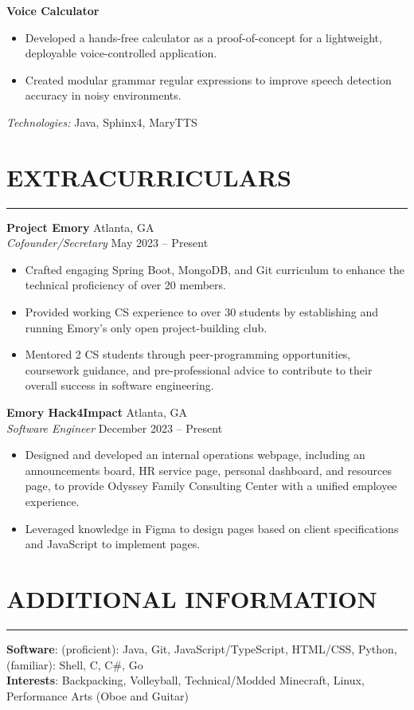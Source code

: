\documentclass[10.5pt]{article}
\begin{document}
\noindent
\textbf{Voice Calculator}
\begin{itemize}
    \item Developed a hands-free calculator as a proof-of-concept for a lightweight, deployable voice-controlled application. \item Created modular grammar regular expressions to improve speech detection accuracy in noisy environments.
\end{itemize}
\emph{Technologies:} {Java, Sphinx4, MaryTTS}

 \vspace{-\baselineskip}
\section*{\large\textbf{EXTRACURRICULARS}}
\vspace{-\baselineskip}
\noindent\rule{\textwidth}{0.4pt}


\noindent
\textbf{Project Emory} \hfill {Atlanta, GA} \\
\emph{Cofounder/Secretary} \hfill {May 2023} -- {Present}
\begin{itemize}
    \item Crafted engaging Spring Boot, MongoDB, and Git curriculum to enhance the technical proficiency of over 20 members. \item Provided working CS experience to over 30 students by establishing and running Emory's only open project-building club. \item Mentored 2 CS students through peer-programming opportunities, coursework guidance, and pre-professional advice to contribute to their overall success in software engineering.
\end{itemize}

\noindent
\textbf{Emory Hack4Impact} \hfill {Atlanta, GA} \\
\emph{Software Engineer} \hfill {December 2023} -- {Present}
\begin{itemize}
    \item Designed and developed an internal operations webpage, including an announcements board, HR service page, personal dashboard, and resources page, to provide Odyssey Family Consulting Center with a unified employee experience. \item Leveraged knowledge in Figma to design pages based on client specifications and JavaScript to implement pages.
\end{itemize}

 \vspace{-\baselineskip}
\section*{\large\textbf{ADDITIONAL INFORMATION}}
\vspace{-\baselineskip}
\noindent\rule{\textwidth}{0.4pt}

\noindent
\textbf{Software}: (proficient): Java, Git, JavaScript/TypeScript, HTML/CSS, Python, (familiar): Shell, C, C\#, Go\\ 
\noindent
\textbf{Interests}: Backpacking, Volleyball, Technical/Modded Minecraft, Linux, Performance Arts (Oboe and Guitar)\\ 
\end{document}
